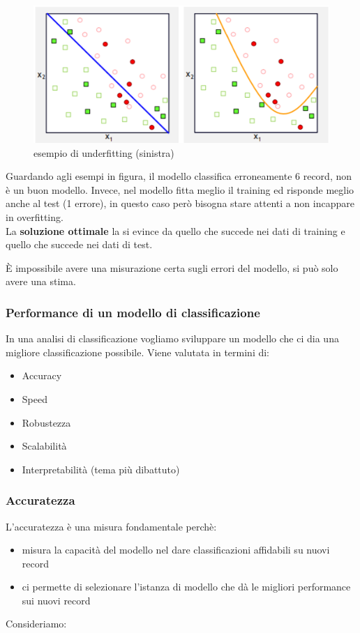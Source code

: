 \begin{figure}[H]
	\centering
	\includegraphics[height=0.3 \linewidth]{classification/pict/underfitting_merge.png}
	\caption{esempio di underfitting (sinistra)}
\end{figure}
Guardando agli esempi in figura, il modello {\color{blue}{blu}} classifica erroneamente 6 record, non è un buon modello. Invece, nel modello {\color{orange}{arancione}} fitta meglio il training ed risponde meglio anche al test (1 errore), in questo caso però bisogna stare attenti a non incappare in overfitting.\\
 
La \textbf{soluzione ottimale} la si evince da quello che succede nei dati di training e quello che succede nei dati di test.

\`E impossibile avere una misurazione certa sugli errori del modello, si pu\`o solo avere una stima. 

\subsubsection{Performance di un modello di classificazione}

In una analisi di classificazione vogliamo sviluppare un modello che ci dia una migliore classificazione possibile. Viene valutata in termini di:
\begin{itemize}
	\item Accuracy
	\item Speed
	\item Robustezza
	\item Scalabilit\`a
	\item Interpretabilit\`a (tema pi\`u dibattuto)
\end{itemize}

\subsubsection{Accuratezza}
L'accuratezza è una misura fondamentale perch\`e: 
\begin{itemize}
	\item misura la capacità del modello nel dare classificazioni affidabili su nuovi record
	\item ci permette di selezionare l'istanza di modello che d\`a le migliori performance sui nuovi record
\end{itemize}
Consideriamo:

